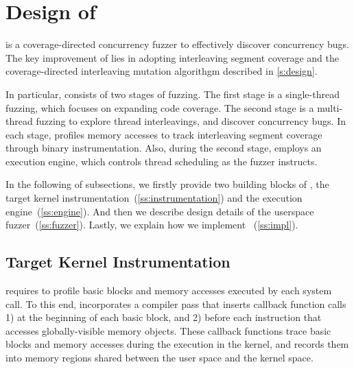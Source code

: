 \section{Design of \sys}
\label{s:impl}

\sys is a coverage-directed concurrency fuzzer to effectively discover
concurrency bugs.
%
The key improvement of \sys lies in adopting interleaving segment
coverage and the coverage-directed interleaving \dr{}mutation
algorithgm described in \autoref{s:design}.
%

\dr{}In particular, \sys consists of two stages of fuzzing.
%
The first stage is a single-thread fuzzing, which focuses on expanding
code coverage.
%
The second stage is a multi-thread fuzzing to explore thread
interleavings, and discover concurrency bugs.
%
In each stage, \sys profiles memory accesses to track interleaving
segment coverage through binary instrumentation.
%
Also, during the second stage, \sys employs an execution engine, which
controls thread scheduling as the fuzzer instructs.



In the following of subsections, we firstly provide two building
blocks of \sys, the target kernel
instrumentation~(\autoref{ss:instrumentation}) and the execution
engine~(\autoref{ss:engine}).
%
And then we describe design details of the userspace
fuzzer~(\autoref{ss:fuzzer}).
%
Lastly, we explain how we implement \sys~(\autoref{ss:impl}).


\subsection{Target Kernel Instrumentation}
\label{ss:instrumentation}

\sys requires to profile basic blocks and memory accesses executed by
each system call.
%
To this end, \sys incorporates a compiler pass that inserts callback
function calls 1) at the beginning of each basic block, and 2) before
each instruction that accesses globally-visible memory objects.
%
These callback functions trace basic blocks and memory accesses during
the execution in the kernel, and records them into memory regions
shared between the user space and the kernel space.



